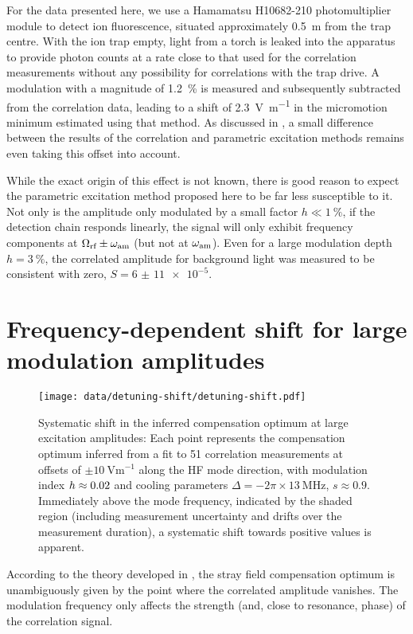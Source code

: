 \documentclass[pra,twocolumn]{revtex4-2}
\begin{document}
For the data presented here, we use a Hamamatsu H10682-210 photomultiplier module to detect ion fluorescence, situated approximately \SI{0.5}{\metre} from the trap centre.
With the ion trap empty, light from a torch is leaked into the apparatus to provide photon counts at a rate close to that used for the \RF{} correlation measurements without any possibility for correlations with the trap \RF{} drive.
A modulation with a magnitude of \SI{1.2}{\percent} is measured and subsequently subtracted from the \RF{} correlation data, leading to a shift of \SI{2.3}{\volt \metre^{-1}} in the micromotion minimum estimated using that method.
As discussed in , a small difference between the results of the \RF{} correlation and parametric excitation methods remains even taking this offset into account.

While the exact origin of this effect is not known, there is good reason to expect the parametric excitation method proposed here to be far less susceptible to it.
Not only is the \RF{} amplitude only modulated by a small factor $h \ll \SI{1}{\percent}$, if the detection chain responds linearly, the signal will only exhibit frequency components at $\Omega_{\textrm{rf}} \pm \omega_{\textrm{am}}$ (but not at $\omega_{\textrm{am}}$).
Even for a large modulation depth $h = \SI{3}{\percent}$, the correlated amplitude for background light was measured to be consistent with zero, $S =\num{6(11)e-5}$.


\section{Frequency-dependent shift for large modulation amplitudes}
\label{sec:detuning-shift}

\begin{figure}
	\texttt{[image: data/detuning-shift/detuning-shift.pdf]}
	\caption{Systematic shift in the inferred compensation optimum at large excitation amplitudes: Each point represents the compensation optimum inferred from a fit to \num{51} correlation measurements at offsets of $\pm \SI{10}{\volt \metre^{-1}}$ along the HF mode direction, with modulation index $h \approx 0.02$ and cooling parameters $\Delta = -2\pi \times \SI{13}{\mega\hertz}$, $s \approx 0.9$. Immediately above the mode frequency, indicated by the shaded region (including measurement uncertainty and drifts over the measurement duration), a systematic shift towards positive values is apparent.}
	\label{fig:detuning-shift}
\end{figure}

According to the theory developed in , the stray field compensation optimum is unambiguously given by the point where the correlated amplitude vanishes.
The modulation frequency only affects the strength (and, close to resonance, phase) of the correlation signal.
\end{document}
